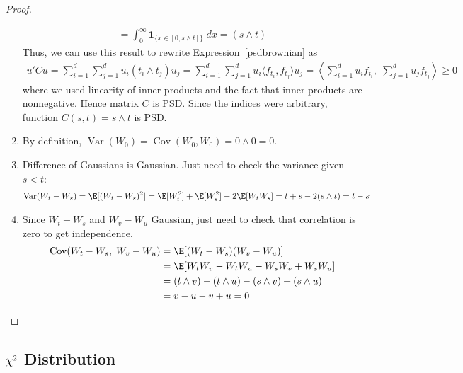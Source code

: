\documentclass[12pt]{article}
\theoremstyle{plain}
\theoremstyle{definition}
\theoremstyle{remark}
\newcommand*{\Chi}{\mbox{\large$\chi$}} %
\newcommand{\one}[1]{\mathbf{1}_{#1}}
\newcommand{\Cov}{\operatorname{Cov}}
\newcommand{\Var}{\operatorname{Var}}
\begin{document}
\begin{proof}
\begin{enumerate}[label=(\roman*)]
\begin{align*}
      = \int_0^\infty \one{\{x\in[0,s\wedge t]\}} \;dx
      = (s\wedge t)
    \end{align*}
    Thus, we can use this result to rewrite Expression~\ref{psdbrownian}
    as
    \begin{align*}
      u'Cu
      = \sum_{i=1}^d\sum_{j=1}^d
        u_i (t_i\wedge t_j) u_j
      = \sum_{i=1}^d\sum_{j=1}^d
        u_i \langle f_{t_i}, f_{t_j}\rangle u_j
      = \left\langle
        \sum_{i=1}^d u_i f_{t_i},\;
        \sum_{j=1}^d u_j f_{t_j}
        \right\rangle
      \geq 0
    \end{align*}
    where we used linearity of inner products and
    the fact that inner products are nonnegative.
    Hence matrix $C$ is PSD. Since the indices were arbitrary, function
    $C(s,t)=s\wedge t$ is PSD.

  \item By definition, $\Var(W_0)=\Cov(W_0,W_0)=0\wedge 0=0$.
  \item Difference of Gaussians is Gaussian. Just need to check the
    variance given $s<t$:
    \begin{align*}
      \Var(W_t-W_s)
      = \E[(W_t-W_s)^2]
      &= \E[W_t^2]+\E[W_s^2]-2\E[W_tW_s]
      = t+s-2(s\wedge t) = t-s
    \end{align*}

  \item
    Since $W_t-W_s$ and $W_v-W_u$ Gaussian, just need to check that
    correlation is zero to get independence.
    \begin{align*}
      \Cov(W_t-W_s,\; W_v-W_u)
      &= \E[(W_t-W_s)(W_v-W_u)] \\
      &= \E[W_tW_v - W_tW_u - W_sW_v + W_sW_u] \\
      &= (t\wedge v) - (t\wedge u) - (s\wedge v) + (s\wedge u) \\
      &= v - u - v + u = 0
    \end{align*}
\end{enumerate}

\end{proof}


\clearpage
\subsection{$\Chi^2$ Distribution}
\end{document}
